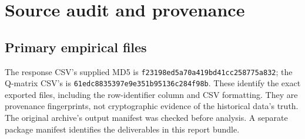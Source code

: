 \documentclass[11pt,a4paper,oneside,headings=normal,parskip=half]{scrreprt}
\newcommand{\code}[1]{\nolinkurl{#1}}
\begin{document}
\chapter{Source audit and provenance}\label{app:sources}
\section{Primary empirical files}
The response CSV's supplied MD5 is \code{f23198ed5a70a419bd41cc258775a832}; the Q-matrix CSV's is \code{61edc8835397e9e351b95136c284f98b}. These identify the exact exported files, including the row-identifier column and CSV formatting. They are provenance fingerprints, not cryptographic evidence of the historical data's truth. The original archive's output manifest was checked before analysis. A separate package manifest identifies the deliverables in this report bundle.
\end{document}
